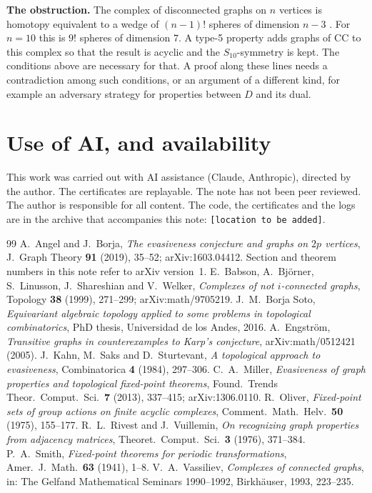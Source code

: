 \documentclass[11pt]{article}
\theoremstyle{plain}
\theoremstyle{definition}
\theoremstyle{remark}
\begin{document}
\medskip\noindent
\textbf{The obstruction.}
The complex of disconnected graphs on $n$ vertices is homotopy equivalent to a wedge of $(n-1)!$ spheres of dimension $n-3$ \cite{Vas,BBLSW}.
For $n=10$ this is $9!$ spheres of dimension $7$.
A type-5 property adds graphs of $\mathrm{CC}$ to this complex so that the result is acyclic and the $S_{10}$-symmetry is kept.
The conditions above are necessary for that.
A proof along these lines needs a contradiction among such conditions, or an argument of a different kind, for example an adversary strategy for properties between $D$ and its dual.

\section{Use of AI, and availability}

This work was carried out with AI assistance (Claude, Anthropic), directed by the author.
The certificates are replayable.
The note has not been peer reviewed.
The author is responsible for all content.
The code, the certificates and the logs are in the archive that accompanies this note: \texttt{[location to be added]}.

{\footnotesize
\begin{thebibliography}{99}
\setlength{\itemsep}{1pt}
 A.~Angel and J.~Borja, \emph{The evasiveness conjecture and graphs on $2p$ vertices}, J.~Graph Theory \textbf{91} (2019), 35--52; arXiv:1603.04412. Section and theorem numbers in this note refer to arXiv version~1.
 E.~Babson, A.~Bj\"orner, S.~Linusson, J.~Shareshian and V.~Welker, \emph{Complexes of not $i$-connected graphs}, Topology \textbf{38} (1999), 271--299; arXiv:math/9705219.
 J.~M.~Borja Soto, \emph{Equivariant algebraic topology applied to some problems in topological combinatorics}, PhD thesis, Universidad de los Andes, 2016.
 A.~Engstr\"om, \emph{Transitive graphs in counterexamples to Karp's conjecture}, arXiv:math/0512421 (2005).
 J.~Kahn, M.~Saks and D.~Sturtevant, \emph{A topological approach to evasiveness}, Combinatorica \textbf{4} (1984), 297--306.
 C.~A.~Miller, \emph{Evasiveness of graph properties and topological fixed-point theorems}, Found.\ Trends Theor.\ Comput.\ Sci.\ \textbf{7} (2013), 337--415; arXiv:1306.0110.
 R.~Oliver, \emph{Fixed-point sets of group actions on finite acyclic complexes}, Comment.\ Math.\ Helv.\ \textbf{50} (1975), 155--177.
 R.~L.~Rivest and J.~Vuillemin, \emph{On recognizing graph properties from adjacency matrices}, Theoret.\ Comput.\ Sci.\ \textbf{3} (1976), 371--384.
 P.~A.~Smith, \emph{Fixed-point theorems for periodic transformations}, Amer.\ J.\ Math.\ \textbf{63} (1941), 1--8.
 V.~A.~Vassiliev, \emph{Complexes of connected graphs}, in: The Gelfand Mathematical Seminars 1990--1992, Birkh\"auser, 1993, 223--235.
\end{thebibliography}
}
\end{document}
